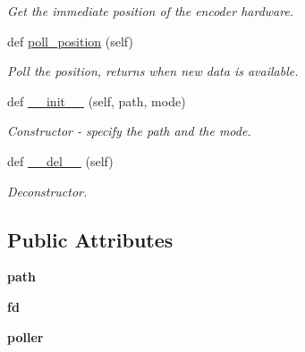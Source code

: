 \begin{DoxyCompactItemize}
\begin{DoxyCompactList}\small\item\em Get the immediate position of the encoder hardware. \end{DoxyCompactList}\item 
def \hyperlink{classeqep_1_1eQEP_add267f1f55ca1e5fcef34b1a70db18a0}{poll\+\_\+position} (self)\hypertarget{classeqep_1_1eQEP_add267f1f55ca1e5fcef34b1a70db18a0}{}\label{classeqep_1_1eQEP_add267f1f55ca1e5fcef34b1a70db18a0}

\begin{DoxyCompactList}\small\item\em Poll the position, returns when new data is available. \end{DoxyCompactList}\item 
def \hyperlink{classeqep_1_1eQEP_a8110a8aae6998a20760af30020f894d2}{\+\_\+\+\_\+init\+\_\+\+\_\+} (self, path, mode)
\begin{DoxyCompactList}\small\item\em Constructor -\/ specify the path and the mode. \end{DoxyCompactList}\item 
def \hyperlink{classeqep_1_1eQEP_ac80fa9e08911c4260207aacc72541863}{\+\_\+\+\_\+del\+\_\+\+\_\+} (self)\hypertarget{classeqep_1_1eQEP_ac80fa9e08911c4260207aacc72541863}{}\label{classeqep_1_1eQEP_ac80fa9e08911c4260207aacc72541863}

\begin{DoxyCompactList}\small\item\em Deconstructor. \end{DoxyCompactList}\end{DoxyCompactItemize}
\subsection*{Public Attributes}
\begin{DoxyCompactItemize}
\item 
{\bfseries path}\hypertarget{classeqep_1_1eQEP_a1230ab18199a963f9d954777a2a336ca}{}\label{classeqep_1_1eQEP_a1230ab18199a963f9d954777a2a336ca}

\item 
{\bfseries fd}\hypertarget{classeqep_1_1eQEP_ac27da69238f8273eaf4e9883baec9aaa}{}\label{classeqep_1_1eQEP_ac27da69238f8273eaf4e9883baec9aaa}

\item 
{\bfseries poller}\hypertarget{classeqep_1_1eQEP_a3894927414d08b27680caa9580fd4776}{}\label{classeqep_1_1eQEP_a3894927414d08b27680caa9580fd4776}

\end{DoxyCompactItemize}
